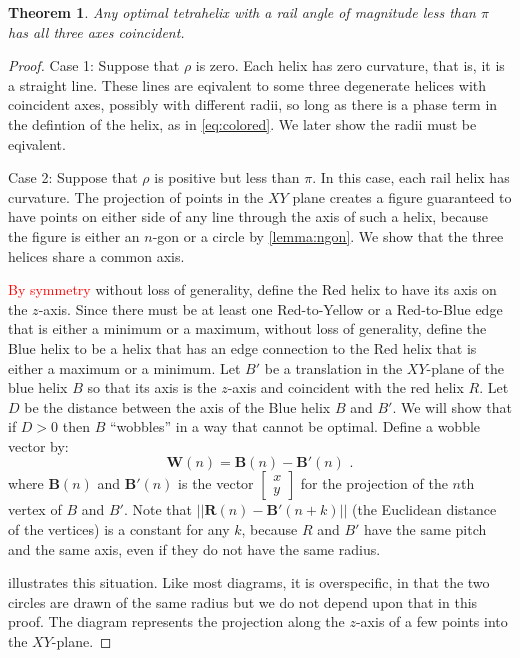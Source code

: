 \documentclass[twocolumn,10pt]{asme2ej}
\newtheorem{theorem}{Theorem}
\renewcommand{\vec}[1]{\mathbf{#1}}
\newcommand{\highlighttext}[1] {\textcolor{red}{#1}}
\begin{document}
\begin{theorem}
  Any optimal tetrahelix with a rail angle of magnitude less than $\pi$ has all three
  axes coincident.
  \label{thm:coincident}
\end{theorem}
\begin{proof}
  Case 1: Suppose that $\rho$ is zero.
  Each helix has zero curvature, that is, it is a straight line. These lines are eqivalent
  to some three degenerate helices with coincident axes, possibly with different radii,
  so long as there is a phase
  term in the defintion of the helix, as in \cref{eq:colored}. We later show the
  radii must be eqivalent.
    
  Case 2: Suppose that $\rho$ is positive but less than $\pi$.
  In this case, each rail helix has
  curvature. The projection of points in the $XY$ plane creates a figure
  guaranteed to have points on either side of any line through the axis of such
  a helix, because the figure is either an $n$-gon or a circle by \cref{lemma:ngon}.
  We show that the three helices share a common axis.

  \highlighttext{By symmetry} without loss of generality, define the Red helix to have its axis on the $z$-axis.
  Since there must be at least one Red-to-Yellow or a Red-to-Blue edge that is either a minimum or a maximum,
  without loss of generality, define the Blue helix to be a helix that
  has an edge connection to the Red helix that is either a maximum or a minimum.
  Let $B'$ be a translation in the $XY$-plane of the blue helix $B$  so that its axis is the $z$-axis and
  coincident with the red helix $R$. Let $D$ be the distance between the axis of the Blue helix
  $B$ and $B'$. We will show that if $D>0$ then $B$ ``wobbles'' in a way that cannot be optimal.
  Define a wobble vector by:
  \begin{equation}
    \vec{W}(n) = \vec{B}(n) - \vec{B}'(n) \text{ .}
  \end{equation}
  where $\vec{B}(n)$ and $\vec{B'}(n)$ is the vector
  $\begin{bmatrix}
    x \\
    y 
  \end{bmatrix}$
  for the projection of the $n$th vertex of $B$ and $B'$. 
  Note that $|| \vec{R}(n) - \vec{B'}(n+k)||$ (the Euclidean distance of the vertices)
  is a constant for any $k$, because $R$ and $B'$ have the
  same pitch and the same axis, even if they do not have the same radius.

   illustrates this situation. Like most diagrams, it is
  overspecific, in that the two circles are drawn of the same radius but we do not
  depend upon that in this proof.  The diagram represents the projection along the
  $z$-axis of a few points into the $XY$-plane.


\end{proof}
\end{document}
